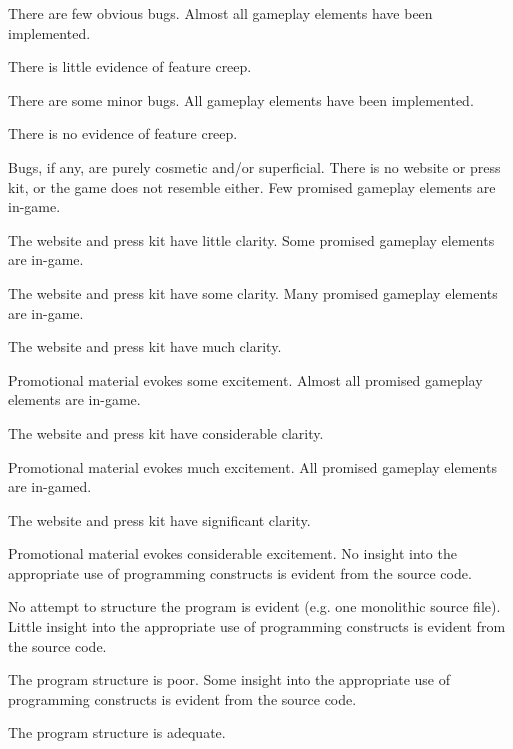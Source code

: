 \documentclass{../fal_assignment}
\begin{document}
\begin{markingrubric}
            \par There are few obvious bugs.
        \grade Almost all gameplay elements have been implemented.
            \par There is little evidence of feature creep.
            \par There are some minor bugs.
        \grade All gameplay elements have been implemented.
            \par There is no evidence of feature creep.
            \par Bugs, if any, are purely cosmetic and/or superficial.
%            
        \grade\fail There is no website or press kit, or the game does not resemble either.
        \grade Few promised gameplay elements are in-game.
            \par The website and press kit have little clarity.
        \grade Some promised gameplay elements are in-game.
            \par The website and press kit have some clarity.
        \grade Many promised gameplay elements are in-game.
            \par The website and press kit have much clarity.
            \par Promotional material evokes some excitement.
        \grade Almost all promised gameplay elements are in-game.
            \par The website and press kit have considerable clarity.
            \par Promotional material evokes much excitement.
        \grade All promised gameplay elements are in-gamed.
            \par The website and press kit have significant clarity.
            \par Promotional material evokes considerable excitement.
%
        \grade\fail No insight into the appropriate use of programming constructs is evident from the source code.
            \par No attempt to structure the program is evident (e.g. one monolithic source file).
        \grade Little insight into the appropriate use of programming constructs is evident from the source code.
            \par The program structure is poor.
        \grade Some insight into the appropriate use of programming constructs is evident from the source code.
            \par The program structure is adequate.

\end{markingrubric}
\end{document}
